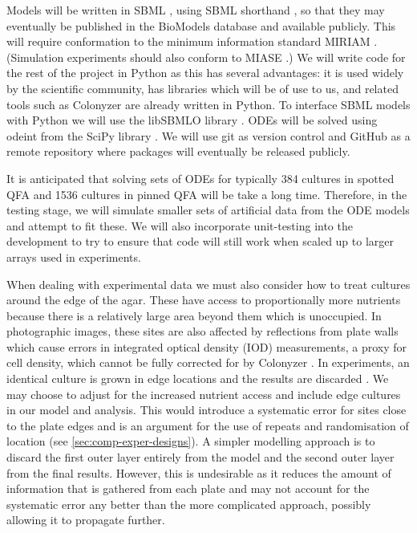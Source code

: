 Models will be written in SBML \citep{Hucka2003}, using SBML shorthand
\citep{Wilkinson2011}, so that they may eventually be published in the
BioModels database \citep{BioModels2015b} and available publicly. This
will require conformation to the minimum information standard MIRIAM
\citep{MIRIAM2005}. (Simulation experiments should also conform to
MIASE \citep{MIASE2011}.) We will write code for the rest of the
project in Python as this has several advantages: it is used widely by
the scientific community, has libraries which will be of use to us,
and related tools such as Colonyzer \citep{Lawless2010} are already
written in Python. To interface SBML models with Python we will use
the libSBMLO library \citep{Bornstein2008}. ODEs will be solved using
odeint from the SciPy library \citep{SciPy}. We will use git as
version control and GitHub as a remote repository where packages will
eventually be released publicly.

It is anticipated that solving sets of ODEs for typically 384 cultures
in spotted QFA and 1536 cultures in pinned QFA will be take a long
time. Therefore, in the testing stage, we will simulate smaller sets
of artificial data from the ODE models and attempt to fit these. We
will also incorporate unit-testing into the development to try to
ensure that code will still work when scaled up to larger arrays used
in experiments.

When dealing with experimental data we must also consider how to treat
cultures around the edge of the agar. These have access to
proportionally more nutrients because there is a relatively large area
beyond them which is unoccupied. In photographic images, these sites
are also affected by reflections from plate walls which cause errors
in integrated optical density (IOD) measurements, a proxy for cell
density, which cannot be fully corrected for by Colonyzer
\citep{Lawless2010}. In experiments, an identical culture is grown in
edge locations and the results are discarded
\citep{Lawless2010,Addinall2011}. We may choose to adjust for the
increased nutrient access and include edge cultures in our model and
analysis. This would introduce a systematic error for sites close to
the plate edges and is an argument for the use of repeats and
randomisation of location (see \ref{sec:comp-exper-designs}). A
simpler modelling approach is to discard the first outer layer
entirely from the model and the second outer layer from the final
results. However, this is undesirable as it reduces the amount of
information that is gathered from each plate and may not account for
the systematic error any better than the more complicated approach,
possibly allowing it to propagate further.

